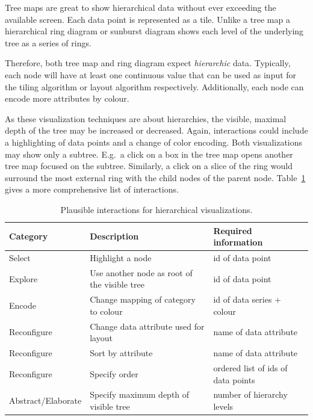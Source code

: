 Tree maps are great to show hierarchical data without ever exceeding the available screen.
Each data point is represented as a tile.
Unlike a tree map a hierarchical ring diagram or sunburst diagram shows each level of the underlying tree as a series of rings.

Therefore, both tree map and ring diagram expect \emph{hierarchic} data.
Typically, each node will have at least one continuous value that can be used as input for the tiling algorithm or layout algorithm respectively.
Additionally, each node can encode more attributes by colour.

As these visualization techniques are about hierarchies, the visible, maximal depth of the tree may be increased or decreased.
Again, interactions could include a highlighting of data points and a change of color encoding.
Both visualizations may show only a subtree.
E.g.\ a click on a box in the tree map opens another tree map focused on the subtree.
Similarly, a click on a slice of the ring would surround the most external ring with the child nodes of the parent node.
Table~\ref{tab:analysis:hierarchies:interactions} gives a more comprehensive list of interactions.


\begin{table}[H]
  \caption{Plausible interactions for hierarchical visualizations.}%
  \label{tab:analysis:hierarchies:interactions}
  \begin{tabular*}{\textwidth}{lll}
    \bf Category & \bf Description & \bf Required information \\
    \hline
    Select & Highlight a node & id of data point \\
    Explore & Use another node as root of the visible tree & id of data point \\
    Encode & Change mapping of category to colour & id of data series + colour \\
    Reconfigure & Change data attribute used for layout & name of data attribute \\
    Reconfigure & Sort by attribute & name of data attribute \\
    Reconfigure & Specify order & ordered list of ids of data points \\
    Abstract/Elaborate & Specify maximum depth of visible tree & number of hierarchy levels \\
  \end{tabular*}
\end{table}

